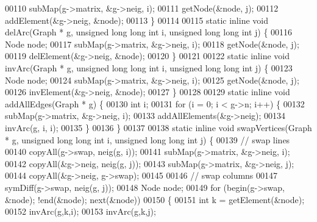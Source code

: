 \begin{DoxyCode}
{00110         subMap(g->matrix, &g->neig, i);
00111         getNode(&node, j);
00112         addElement(&g->neig, &node);
00113 \}
00114 
00115 \textcolor{keyword}{static} \textcolor{keyword}{inline} \textcolor{keywordtype}{void} delArc(Graph * g, \textcolor{keywordtype}{unsigned} \textcolor{keywordtype}{long} \textcolor{keywordtype}{long} \textcolor{keywordtype}{int} i, \textcolor{keywordtype}{unsigned} \textcolor{keywordtype}{long} \textcolor{keywordtype}{long} \textcolor{keywordtype}{int} j) \{
00116         Node node;
00117         subMap(g->matrix, &g->neig, i);
00118         getNode(&node, j);
00119         delElement(&g->neig, &node);
00120 \}
00121 
00122 \textcolor{keyword}{static} \textcolor{keyword}{inline} \textcolor{keywordtype}{void} invArc(Graph * g, \textcolor{keywordtype}{unsigned} \textcolor{keywordtype}{long} \textcolor{keywordtype}{long} \textcolor{keywordtype}{int} i, \textcolor{keywordtype}{unsigned} \textcolor{keywordtype}{long} \textcolor{keywordtype}{long} \textcolor{keywordtype}{int} j) \{
00123         Node node;
00124         subMap(g->matrix, &g->neig, i);
00125         getNode(&node, j);
00126         invElement(&g->neig, &node);
00127 \}
00128 
00129 \textcolor{keyword}{static} \textcolor{keyword}{inline} \textcolor{keywordtype}{void} addAllEdges(Graph * g) \{
00130         \textcolor{keywordtype}{int} i;
00131         \textcolor{keywordflow}{for} (i = 0; i < g->n; i++) \{
00132                 subMap(g->matrix, &g->neig, i);
00133                 addAllElements(&g->neig);
00134                 invArc(g, i, i);
00135         \}
00136 \}
00137 
00138 \textcolor{keyword}{static} \textcolor{keyword}{inline} \textcolor{keywordtype}{void} swapVertices(Graph * g, \textcolor{keywordtype}{unsigned} \textcolor{keywordtype}{long} \textcolor{keywordtype}{long} \textcolor{keywordtype}{int} i, \textcolor{keywordtype}{unsigned} \textcolor{keywordtype}{long} \textcolor{keywordtype}{long} \textcolor{keywordtype}{int} j) \{
00139         \textcolor{comment}{// swap lines}
00140         copyAll(g->swap, neig(g, i));
00141         subMap(g->matrix, &g->neig, i);
00142         copyAll(&g->neig, neig(g, j));
00143         subMap(g->matrix, &g->neig, j);
00144         copyAll(&g->neig, g->swap);
00145 
00146         \textcolor{comment}{// swap columns}
00147         symDiff(g->swap, neig(g, j));
00148         Node node;
00149         \textcolor{keywordflow}{for} (begin(g->swap, &node); !end(&node); next(&node))
00150         \{
00151                 \textcolor{keywordtype}{int} k = getElement(&node);
00152                 invArc(g,k,i);
00153                 invArc(g,k,j);
}
\end{DoxyCode}

